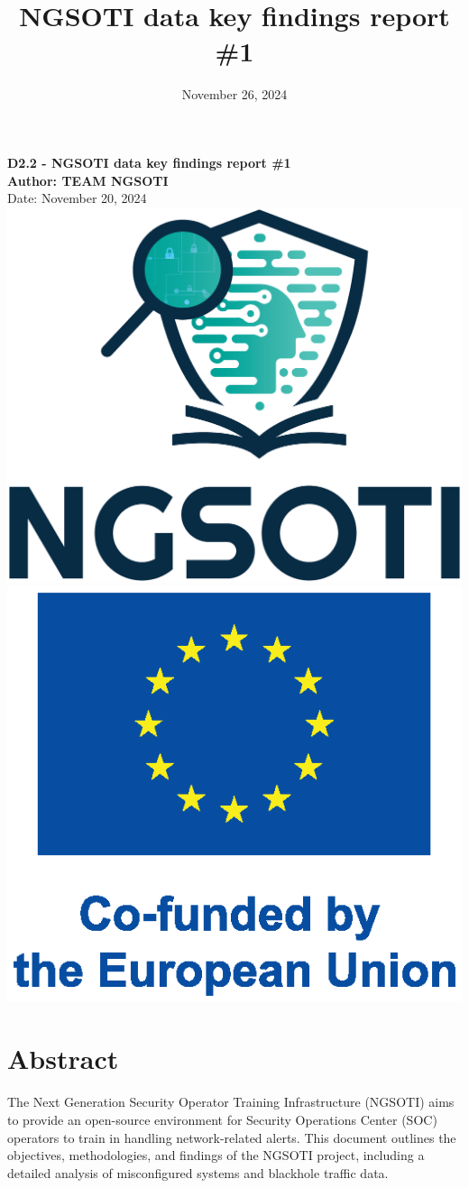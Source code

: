 \documentclass[10pt,a4paper]{report}
\date{November 26, 2024}
\title{NGSOTI data key findings report \#1}
\begin{document}
\begin{titlepage}
    \begin{center}
        {\Huge \textbf{D2.2 - NGSOTI data key findings report \#1}} \\[1.5cm]
        {\Large \textbf{Author: TEAM NGSOTI}} \\[0.5cm]
        {\large Date: November 20, 2024} \\[3cm]
        \includegraphics[height=0.3\textwidth]{img/ngsoti.eps}
        \hspace{2cm} %
        \includegraphics[height=0.3\textwidth]{img/eu_funded_en.eps}
    \end{center}
\end{titlepage}





\chapter*{Abstract}
The Next Generation Security Operator Training Infrastructure (NGSOTI) aims to provide an open-source environment for Security Operations Center (SOC) operators to train in handling network-related alerts. This document outlines the objectives, methodologies, and findings of the NGSOTI project, including a detailed analysis of misconfigured systems and blackhole traffic data.
\end{document}
